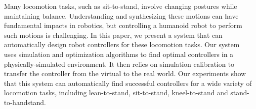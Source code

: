 Many locomotion tasks, such as sit-to-stand, involve changing postures while maintaining balance. Understanding and synthesizing these motions can have fundamental impacts in robotics, but controlling a humanoid robot to perform such motions is challenging. In this paper, we present a system that can automatically design robot controllers for these locomotion tasks. Our system uses simulation and optimization algorithms to find optimal controllers in a physically-simulated environment. It then relies on simulation calibration to transfer the controller from the virtual to the real world. Our experiments show that this system can automatically find successful controllers for a wide variety of locomotion tasks, including lean-to-stand, sit-to-stand, kneel-to-stand and stand-to-handstand.
